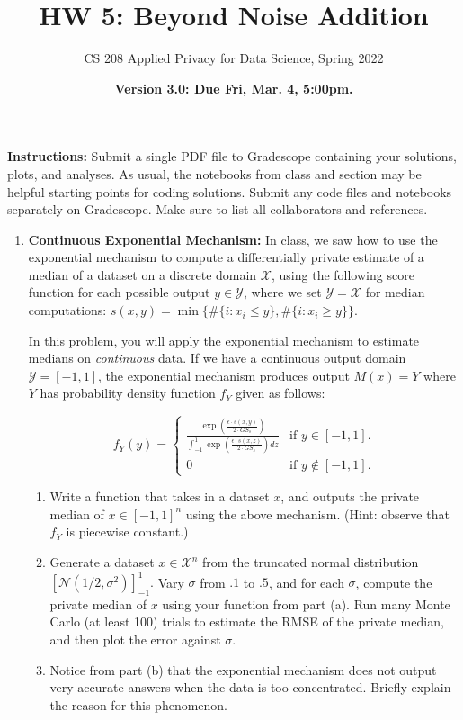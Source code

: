 \documentclass[11pt]{article}
\title{\vspace{-1.5cm} HW 5: Beyond Noise Addition
}
\author{CS 208 Applied Privacy for Data Science, Spring 2022}
\date{\textbf{Version 3.0: Due Fri, Mar. 4, 5:00pm.}}
\newcommand{\instructions}{\noindent \textbf{Instructions:} Submit a single PDF file to Gradescope containing your solutions, plots, and analyses. As usual, the notebooks from class and section may be helpful starting points for coding solutions. Submit any code files and notebooks separately on Gradescope. Make sure to list all collaborators and references.}
\newcommand{\calX}{\mathcal{X}}
\newcommand{\calY}{\mathcal{Y}}
\begin{document}
	\maketitle
	
	\instructions
	
	\begin{enumerate}[leftmargin=*]
		
		\item \textbf{Continuous Exponential Mechanism:}
		In class, we saw how to use the exponential mechanism to compute a differentially private estimate of a median of a dataset on a discrete domain $\calX$, using the following score function for each possible output $y\in \calY$, where we set $\calY=\calX$ for median computations:
		$s(x,y)=\min\{\#\{i: x_i\le y\},\#\{i: x_i\ge y\}\}.$

		
		In this problem, you will apply the exponential mechanism
		to estimate medians on {\em continuous} data.		
		If we have a continuous output domain $\calY=[-1,1]$, the exponential mechanism produces output
		$M(x) = Y$ where $Y$ has probability density function $f_Y$ given as follows:
		
		$$f_Y(y) = \begin{cases}
		\frac{\exp\left(\frac{\epsilon\cdot s(x,y)}{2\cdot GS_s}\right)}{\int_{-1}^1 \exp\left(\frac{\epsilon\cdot s(x,z)}{2\cdot GS_s}\right) dz} & \text{if } y\in [-1,1].\\
		0 & \text{if } y\notin [-1,1].
		\end{cases}$$
		
		\begin{enumerate}
			\item Write a function that takes in a dataset $x$, and outputs the private median of $x\in [-1,1]^n$ using the above mechanism.
			(Hint: observe that $f_Y$ is
			piecewise constant.)
			
			\item Generate a dataset $x\in\calX^n$ from the truncated normal distribution $\left[\mathcal{N}(1/2,\sigma^2)\right]_{-1}^1.$ Vary $\sigma$ from $.1$ to $.5$, and for each $\sigma$, compute the private median of $x$ using your function from part (a). Run many Monte Carlo (at least 100)
			trials to estimate the RMSE
			of the private median, and then plot the error against $\sigma$.
			
			\item Notice from part (b) that the exponential mechanism does
			not output very accurate answers when the data is too concentrated. Briefly explain the reason for this phenomenon.
		\end{enumerate}
		

\end{enumerate}
\end{document}
